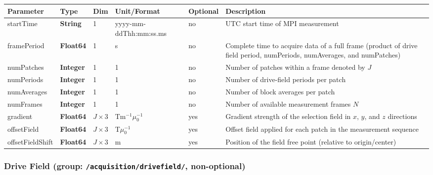 \documentclass[landscape,a4paper]{article} %
\newcommand{\inl}[1]{\lstinline[columns=fixed]{#1}}
\newcommand{\inltab}[1]{{\ttfamily\bfseries\color{blue}#1}}
\newcommand{\inlvar}[1]{{\ttfamily#1}}
\begin{document}
\noindent \begin{tabularx}{\columnwidth}{lllllX} 
\textbf{Parameter} & \textbf{Type} & \textbf{Dim} & \textbf{Unit/Format} & \textbf{Optional} & \textbf{Description} \\ \hline 
\inlvar{startTime} & \inltab{String} & 1 & yyyy-mm-ddThh:mm:ss.ms & no & UTC start time of MPI measurement \\ \hline
\inlvar{framePeriod} & \inltab{Float64} & 1 & s & no & Complete time to acquire data of a full frame (product of drive field \inlvar{period}, \inlvar{numPeriods}, \inlvar{numAverages}, and \inlvar{numPatches}) \\ \hline
\inlvar{numPatches} & \inltab{Integer} & 1 & 1 & no & Number of patches within a frame denoted by $J$ \\ \hline
\inlvar{numPeriods} & \inltab{Integer} & 1 & 1 & no & Number of drive-field periods per patch \\ \hline
\inlvar{numAverages} & \inltab{Integer} & 1 & 1& no & Number of block averages per patch\\ \hline 
\inlvar{numFrames} & \inltab{Integer} & 1 & 1& no & Number of available measurement frames $N$ \\ \hline
\inlvar{gradient} & \inltab{Float64} & $J \times 3$ & Tm$^{-1}\mu_0^{-1}$ & yes & Gradient strength of the selection field in $x$, $y$, and $z$ directions \\ \hline
\inlvar{offsetField} & \inltab{Float64} & $J \times 3$ & T$\mu_0^{-1}$ & yes & Offset field applied for each patch in the measurement sequence \\ \hline
\inlvar{offsetFieldShift} & \inltab{Float64} & $J \times 3$ & m & yes & Position of the field free point (relative to origin/center) \\ \hline
\end{tabularx}

\subsubsection{Drive Field (group: \inl{/acquisition/drivefield/}, non-optional)}
\end{document}
